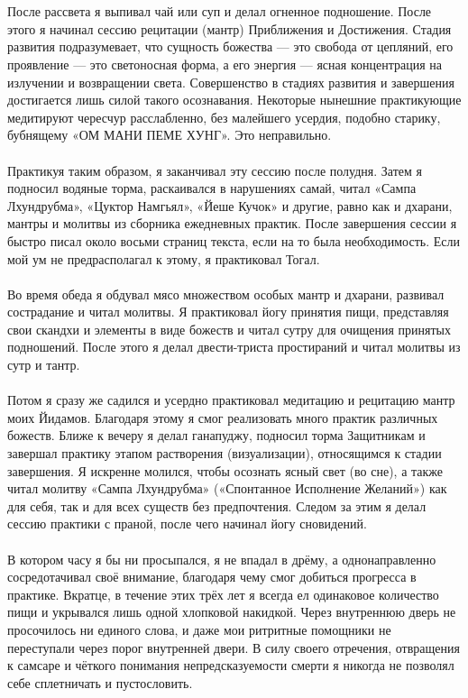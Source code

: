\\ \\ После рассвета я выпивал чай или суп и делал огненное подношение. После этого я начинал сессию рецитации (мантр) Приближения и Достижения. Стадия развития подразумевает, что сущность божества — это свобода от цепляний, его проявление — это светоносная форма, а его энергия — ясная концентрация на излучении и возвращении света. Совершенство в стадиях развития и завершения достигается лишь силой такого осознавания. Некоторые нынешние практикующие медитируют чересчур расслабленно, без малейшего усердия, подобно старику, бубнящему «ОМ МАНИ ПЕМЕ ХУНГ». Это неправильно.
\newpage
\\ \\ Практикуя таким образом, я заканчивал эту сессию после полудня. Затем я подносил водяные торма, раскаивался в нарушениях самай, читал «Сампа Лхундрубма», «Цуктор Намгьял», «Йеше Кучок» и другие, равно как и дхарани, мантры и молитвы из сборника ежедневных практик. После завершения сессии я быстро писал около восьми страниц текста, если на то была необходимость. Если мой ум не предрасполагал к этому, я практиковал Тогал.
\\ \\ Во время обеда я обдувал мясо множеством особых мантр и дхарани, развивал сострадание и читал молитвы. Я практиковал йогу принятия пищи, представляя свои скандхи и элементы в виде божеств и читал сутру для очищения принятых подношений. После этого я делал двести-триста простираний и читал молитвы из сутр и тантр.
\\ \\ Потом я сразу же садился и усердно практиковал медитацию и рецитацию мантр моих Йидамов. Благодаря этому я смог реализовать много практик различных божеств. Ближе к вечеру я делал ганапуджу, подносил торма Защитникам и завершал практику этапом растворения (визуализации), относящимся к стадии завершения. Я искренне молился, чтобы осознать ясный свет (во сне), а также читал молитву «Сампа Лхундрубма» («Спонтанное Исполнение Желаний») как для себя, так и для всех существ без предпочтения. Следом за этим я делал сессию практики с праной, после чего начинал йогу сновидений.
\\ \\ В котором часу я бы ни просыпался, я не впадал в дрёму, а однонаправленно сосредотачивал своё внимание, благодаря чему смог добиться прогресса в практике. Вкратце, в течение этих трёх лет я всегда ел одинаковое количество пищи и укрывался лишь одной хлопковой накидкой. Через внутреннюю дверь не просочилось ни единого слова, и даже мои ритритные помощники не переступали через порог внутренней двери. В силу своего отречения, отвращения к самсаре и чёткого понимания непредсказуемости смерти я никогда не позволял себе сплетничать и пустословить.

